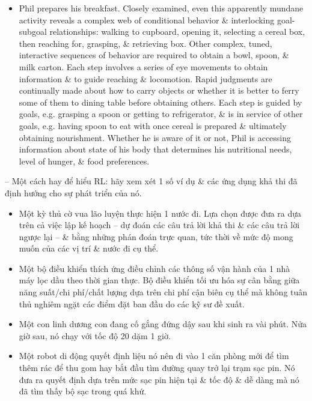 \documentclass{article}
\begin{document}
\begin{itemize}
\begin{itemize}
\begin{itemize}
            \item Phil prepares his breakfast. Closely examined, even this apparently mundane activity reveals a complex web of conditional behavior \& interlocking goal-subgoal relationships: walking to cupboard, opening it, selecting a cereal box, then reaching for, grasping, \& retrieving box. Other complex, tuned, interactive sequences of behavior are required to obtain a bowl, spoon, \& milk carton. Each step involves a series of eye movements to obtain information \& to guide reaching \& locomotion. Rapid judgments are continually made about how to carry objects or whether it is better to ferry some of them to dining table before obtaining others. Each step is guided by goals, e.g. grasping a spoon or getting to refrigerator, \& is in service of other goals, e.g. having spoon to eat with once cereal is prepared \& ultimately obtaining nourishment. Whether he is aware of it or not, Phil is accessing information about state of his body that determines his nutritional needs, level of hunger, \& food preferences.
        \end{itemize}
        -- Một cách hay để hiểu RL: hãy xem xét 1 số ví dụ \& các ứng dụng khả thi đã định hướng cho sự phát triển của nó.
        \begin{itemize}
            \item Một kỳ thủ cờ vua lão luyện thực hiện 1 nước đi. Lựa chọn được đưa ra dựa trên cả việc lập kế hoạch -- dự đoán các câu trả lời khả thi \& các câu trả lời ngược lại -- \& bằng những phán đoán trực quan, tức thời về mức độ mong muốn của các vị trí \& nước đi cụ thể.
            \item Một bộ điều khiển thích ứng điều chỉnh các thông số vận hành của 1 nhà máy lọc dầu theo thời gian thực. Bộ điều khiển tối ưu hóa sự cân bằng giữa năng suất/chi phí/chất lượng dựa trên chi phí cận biên cụ thể mà không tuân thủ nghiêm ngặt các điểm đặt ban đầu do các kỹ sư đề xuất.
            \item Một con linh dương con đang cố gắng đứng dậy sau khi sinh ra vài phút. Nửa giờ sau, nó chạy với tốc độ 20 dặm 1 giờ.
            \item Một robot di động quyết định liệu nó nên đi vào 1 căn phòng mới để tìm thêm rác để thu gom hay bắt đầu tìm đường quay trở lại trạm sạc pin. Nó đưa ra quyết định dựa trên mức sạc pin hiện tại \& tốc độ \& dễ dàng mà nó đã tìm thấy bộ sạc trong quá khứ.

\end{itemize}
\end{itemize}
\end{itemize}
\end{document}
